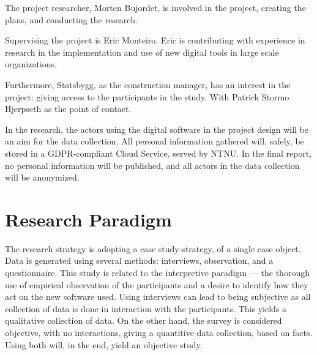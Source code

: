 The project researcher, Morten Bujordet, is involved in the project, creating the plans, and conducting the research.
	 
Supervising the project is Eric Monteiro. Eric is contributing with experience in research in the implementation and use of new digital tools in large scale organizations. 

Furthermore, Statsbygg, as the construction manager, has an interest in the project: giving access to the participants in the study. With Patrick Stormo Hjerpseth as the point of contact.
	 
In the research, the actors using the digital software in the project design will be an aim for the data collection. All personal information gathered will, safely, be stored in a GDPR-compliant Cloud Service, served by NTNU. In the final report, no personal information will be published, and all actors in the data collection will be anonymized.

\section*{Research Paradigm}

The research strategy is adopting a case study-strategy, of a single case object. Data is generated using several methods: interviews, observation, and a questionnaire. This study is related to the interpretive paradigm — the thorough use of empirical observation of the participants and a desire to identify how they act on the new software used. Using interviews can lead to being subjective as all collection of data is done in interaction with the participants. This yields a qualitative collection of data. On the other hand, the survey is considered objective, with no interactions, giving a quantitive data collection, based on facts. Using both will, in the end, yield an objective study.

